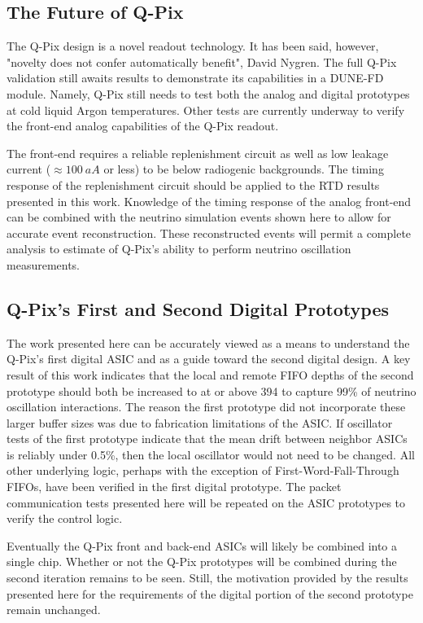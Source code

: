 \subsection{The Future of Q-Pix}

The Q-Pix design is a novel readout technology.
It has been said, however, "novelty does not confer automatically benefit", David Nygren.
The full Q-Pix validation still awaits results to demonstrate its capabilities in a DUNE-FD module.
Namely, Q-Pix still needs to test both the analog and digital prototypes at cold liquid Argon temperatures.
Other tests are currently underway to verify the front-end analog capabilities of the Q-Pix readout.

The front-end requires a reliable replenishment circuit as well as low leakage current ($\approx 100~\unit{aA}$ or less) to be below radiogenic backgrounds.
The timing response of the replenishment circuit should be applied to the RTD results presented in this work.
Knowledge of the timing response of the analog front-end can be combined with the neutrino simulation events shown here to allow for accurate event reconstruction.
These reconstructed events will permit a complete analysis to estimate of Q-Pix's ability to perform neutrino oscillation measurements.

\subsection{Q-Pix's First and Second Digital Prototypes}

The work presented here can be accurately viewed as a means to understand the Q-Pix's first digital ASIC and as a guide toward the second digital design.
A key result of this work indicates that the local and remote FIFO depths of the second prototype should both be increased to at or above 394 to capture 99\% of neutrino oscillation interactions.
The reason the first prototype did not incorporate these larger buffer sizes was due to fabrication limitations of the ASIC.
If oscillator tests of the first prototype indicate that the mean drift between neighbor ASICs is reliably under 0.5\%, then the local oscillator would not need to be changed.
All other underlying logic, perhaps with the exception of First-Word-Fall-Through FIFOs, have been verified in the first digital prototype.
The packet communication tests presented here will be repeated on the ASIC prototypes to verify the control logic.

Eventually the Q-Pix front and back-end ASICs will likely be combined into a single chip.
Whether or not the Q-Pix prototypes will be combined during the second iteration remains to be seen.
Still, the motivation provided by the results presented here for the requirements of the digital portion of the second prototype remain unchanged.
